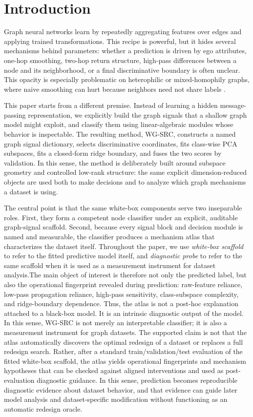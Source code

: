\documentclass{article}
\newcommand{\SRC}{\textsc{WG-SRC}}
\begin{document}
\section{Introduction}
Graph neural networks learn by repeatedly aggregating features over edges and applying trained transformations. This recipe is powerful, but it hides several mechanisms behind parameters: whether a prediction is driven by ego attributes, one-hop smoothing, two-hop return structure, high-pass differences between a node and its neighborhood, or a final discriminative boundary is often unclear. This opacity is especially problematic on heterophilic or mixed-homophily graphs, where naive smoothing can hurt because neighbors need not share labels \citep{pei2020geomgcn,zhu2020beyond,lim2021linkx}.

This paper starts from a different premise. Instead of learning a hidden
message-passing representation, we explicitly build the graph signals that a
shallow graph model might exploit, and classify them using linear-algebraic
modules whose behavior is inspectable. The resulting method, \SRC, constructs
a named graph signal dictionary, selects discriminative coordinates, fits
class-wise PCA subspaces, fits a closed-form ridge boundary, and fuses the two
scores by validation. In this sense, the method is deliberately built around
subspace geometry and controlled low-rank structure: the same explicit
dimension-reduced objects are used both to make decisions and to analyze which
graph mechanisms a dataset is using.


The central point is that the same white-box components serve two inseparable
roles. First, they form a competent node classifier under an explicit,
auditable graph-signal scaffold. Second, because every signal block and
decision module is named and measurable, the classifier produces a mechanism
atlas that characterizes the dataset itself. Throughout the paper, we use \emph{white-box scaffold} to refer to the fitted
predictive model itself, and \emph{diagnostic probe} to refer to the same
scaffold when it is used as a measurement instrument for dataset analysis.The main object of interest is
therefore not only the predicted label, but also the operational fingerprint
revealed during prediction: raw-feature reliance, low-pass propagation
reliance, high-pass sensitivity, class-subspace complexity, and ridge-boundary
dependence. Thus, the atlas is not a post-hoc explanation attached to a
black-box model. It is an intrinsic diagnostic output of the model. In this
sense, \SRC{} is not merely an interpretable classifier; it is also a
measurement instrument for graph datasets. The supported claim is not that the atlas automatically discovers the optimal
redesign of a dataset or replaces a full redesign search. Rather, after a standard train/validation/test evaluation of the fitted
white-box scaffold, the atlas yields operational fingerprints and mechanism
hypotheses that can be checked against aligned interventions and used as
post-evaluation diagnostic guidance. In this sense, prediction becomes reproducible diagnostic evidence
about dataset behavior, and that evidence can guide later model analysis and
dataset-specific modification without functioning as an automatic redesign
oracle.
\end{document}
